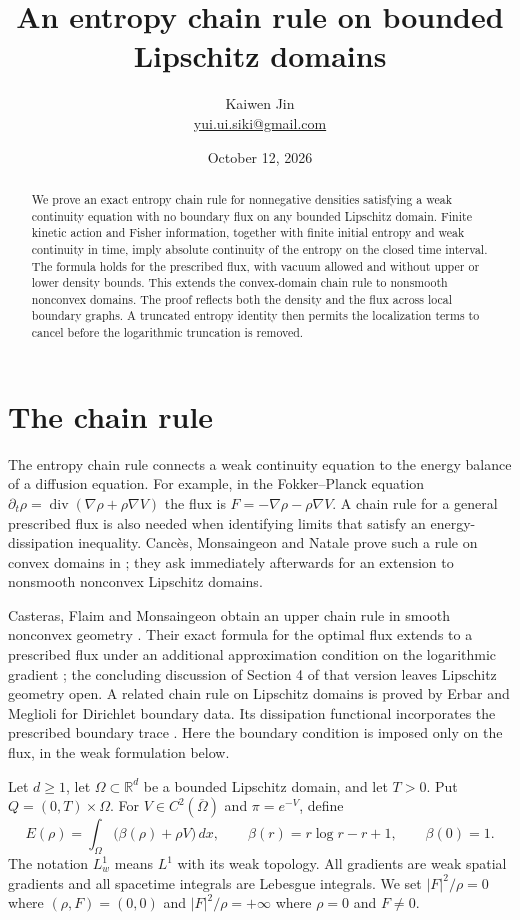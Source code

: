 \documentclass[11pt]{article}
\title{An entropy chain rule on bounded Lipschitz domains}
\author{Kaiwen Jin\\\small\href{mailto:yui.ui.siki@gmail.com}{yui.ui.siki@gmail.com}}
\date{October 12, 2026}
\newcommand{\R}{\mathbb R}
\newcommand{\dd}{\,dx}
\newcommand{\grad}{\nabla}
\newcommand{\Div}{\operatorname{div}}
\begin{document}
\maketitle
\begin{abstract}
We prove an exact entropy chain rule for nonnegative densities satisfying a
weak continuity equation with no boundary flux on any bounded Lipschitz
domain. Finite kinetic action and Fisher information, together with finite
initial entropy and weak continuity in time, imply absolute continuity of the
entropy on the closed time interval. The formula holds for the prescribed
flux, with vacuum allowed and without upper or lower density bounds. This
extends the convex-domain chain rule to nonsmooth nonconvex domains.
The proof reflects both the density and the flux across local boundary graphs.
A truncated entropy identity then permits the localization terms to cancel
before the logarithmic truncation is removed.
\end{abstract}

\section{The chain rule}\label{sec:theorem}
The entropy chain rule connects a weak continuity equation to the energy
balance of a diffusion equation. For example, in the Fokker--Planck equation
$\partial_t\rho=\Div(\grad\rho+\rho\grad V)$ the flux is
$F=-\grad\rho-\rho\grad V$. A chain rule for a general prescribed flux is
also needed when identifying limits that satisfy an energy-dissipation
inequality. Canc\`es, Monsaingeon and Natale prove such a rule on convex
domains in \cite[Proposition A.1]{CMN}; they ask immediately afterwards for
an extension to nonsmooth nonconvex Lipschitz domains.

Casteras, Flaim and Monsaingeon obtain an upper chain rule in smooth
nonconvex geometry \cite[Theorem 3]{CFM}. Their exact formula for the
optimal flux extends to a prescribed flux under an additional approximation
condition on the logarithmic gradient \cite[Theorem 4]{CFM}; the concluding
discussion of Section 4 of that version leaves Lipschitz geometry open.
A related chain rule on Lipschitz domains is proved by Erbar and Meglioli
\cite[Proposition 5.15]{EM} for Dirichlet boundary data. Its dissipation
functional incorporates the prescribed boundary trace
\cite[Definition 5.7]{EM}. Here the boundary condition is imposed only on
the flux, in the weak formulation below.

Let $d\geq1$, let $\Omega\subset\R^d$ be a bounded Lipschitz domain, and
let $T>0$. Put $Q=(0,T)\times\Omega$. For $V\in C^2(\overline\Omega)$
and $\pi=e^{-V}$, define
\begin{equation}\label{eq:entropy}
 E(\rho)=\int_\Omega\bigl(\beta(\rho)+\rho V\bigr)\dd,
 \qquad \beta(r)=r\log r-r+1,\qquad \beta(0)=1.
\end{equation}
The notation $L^1_w$ means $L^1$ with its weak topology. All gradients are
weak spatial gradients and all spacetime integrals are Lebesgue integrals.
We set $|F|^2/\rho=0$ where $(\rho,F)=(0,0)$ and $|F|^2/\rho=+\infty$
where $\rho=0$ and $F\ne0$.
\end{document}
